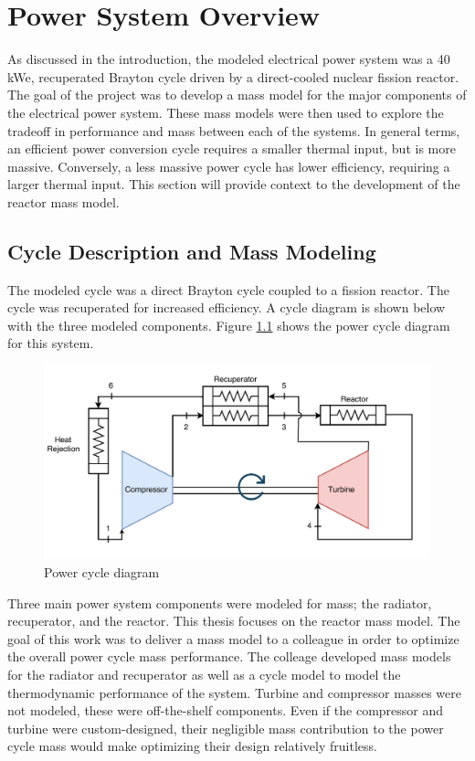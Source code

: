 \chapter{Power System Overview}
As discussed in the introduction, the modeled electrical power system was a 40
kWe, recuperated Brayton cycle driven by a direct-cooled nuclear fission reactor. The goal
of the project was to develop a mass model for the major components of the
electrical power system. These mass models were then used to explore the
tradeoff in performance and mass between each of the systems. In general terms,
an efficient power conversion cycle requires a smaller thermal input, but is
more massive. Conversely, a less massive power cycle has lower efficiency,
requiring a larger thermal input. This section will provide context to the
development of the reactor mass model.

\section{Cycle Description and Mass Modeling}
The modeled cycle was a direct Brayton cycle coupled to a fission reactor. The
cycle was recuperated for increased efficiency. A cycle diagram is shown below
with the three modeled components. Figure \ref{fig:power_cycle} shows the power
cycle diagram for this system.

\begin{figure}[h]
    \centering
    \includegraphics[width=5in]{../images/power_cycle.png}
\caption{Power cycle diagram}
\label{fig:power_cycle}
\end{figure}

Three main power system components were modeled for
mass; the radiator, recuperator, and the reactor. This thesis focuses on the
reactor mass model. The goal of this work was to deliver a mass
model to a colleague in order to optimize the overall power cycle mass
performance. The colleage developed mass models for the radiator and recuperator
as well as a cycle model to model the thermodynamic performance of the system.
Turbine and compressor masses were not modeled, these were off-the-shelf
components. Even if the compressor and turbine were custom-designed, their
negligible mass contribution to the power cycle mass would make optimizing their
design relatively fruitless.

